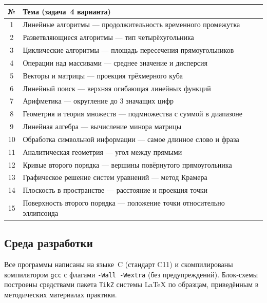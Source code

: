 \begin{center}
\begin{longtable}{cl}
\toprule
№ & Тема (задача~4 варианта) \\
\midrule
1  & Линейные алгоритмы --- продолжительность временного промежутка \\
2  & Разветвляющиеся алгоритмы --- тип четырёхугольника \\
3  & Циклические алгоритмы --- площадь пересечения прямоугольников \\
4  & Операции над массивами --- среднее значение и дисперсия \\
5  & Векторы и матрицы --- проекция трёхмерного куба \\
6  & Линейный поиск --- верхняя огибающая линейных функций \\
7  & Арифметика --- округление до 3 значащих цифр \\
8  & Геометрия и теория множеств --- подмножества с суммой в диапазоне \\
9  & Линейная алгебра --- вычисление минора матрицы \\
10 & Обработка символьной информации --- самое длинное слово и фраза \\
11 & Аналитическая геометрия --- угол между прямыми \\
12 & Кривые второго порядка --- вершины повёрнутого прямоугольника \\
13 & Графическое решение систем уравнений --- метод Крамера \\
14 & Плоскость в пространстве --- расстояние и проекция точки \\
15 & Поверхность второго порядка --- положение точки относительно эллипсоида \\
\bottomrule
\end{longtable}
\end{center}

\subsection{Среда разработки}

Все программы написаны на языке~C (стандарт C11) и скомпилированы
компилятором \texttt{gcc} с флагами \texttt{-Wall~-Wextra} (без
предупреждений).  Блок-схемы построены средствами пакета \texttt{TikZ}
системы \LaTeX{} по образцам, приведённым в методических материалах
практики.
